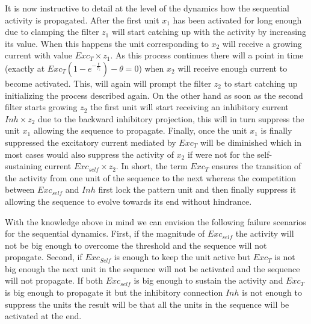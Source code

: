 \documentclass{esannV2}
\begin{document}

It is now instructive to detail at the level of the dynamics how the sequential activity is propagated. After the first unit $x_1$ has been activated for long enough due to clamping the filter $z_1$ will start catching up with the activity by increasing its value. When this happens the unit corresponding to $x_2$ will receive a growing current with value $Exc_{T} \times z_1$. As this process continues there will a point in time (exactly at $Exc_{T}(1 - e^{-\frac{t}{\tau_z}}) - \theta = 0$) when $x_2$ will receive enough current to become activated. This, will again will prompt the filter $z_2$ to start catching up initializing the process described again. On the other hand as soon as the second filter starts growing $z_2$ the first unit will start receiving an inhibitory current $Inh \times z_2$ due to the backward inhibitory projection, this will in turn suppress the unit $x_1$ allowing the sequence to propagate. Finally, once the unit $x_1$ is finally suppressed the excitatory current mediated by $Exc_T$ will be diminished which in most cases would also suppress the activity of $x_2$ if were not for the self-sustaining current $Exc_{self} \times z_2$. In short, the term $Exc_T$ ensures the transition of the activity from one unit of the sequence to the next whereas the competition between $Exc_{self}$ and $Inh$ first lock the pattern unit and then finally suppress it allowing the sequence to evolve towards its end without hindrance.

With the knowledge above in mind we can envision the following  failure scenarios for the sequential dynamics. First, if the magnitude of $Exc_{self}$ the activity will not be big enough to overcome the threshold and the sequence will not propagate. Second, if $Exc_{Self}$ is enough to keep the unit active but $Exc_{T}$ is not big enough the next unit in the sequence will not be activated and the sequence will not propagate. If both $Exc_{self}$ is big enough to sustain the activity and $Exc_{T}$ is big enough to propagate it but the inhibitory connection $Inh$ is not enough to suppress the units the result will be that all the units in the sequence will be activated at the end. 
\end{document}
